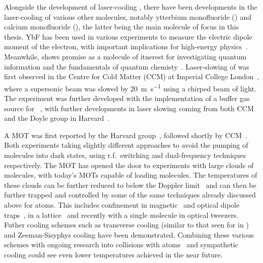 Alongside the development of laser-cooling \SrF{}, there have been developments
in the laser-cooling of various other molecules, notably ytterbium monofluoride
(\YbF{}) and calcium monofluoride (\CaF{}), the latter being the main molecule
of focus in this thesis. YbF has been used in various experiments to measure
the electric dipole moment of the electron, with important implications for
high-energy physics~\cite{}. Meanwhile, \CaF{} shows promise as a molecule of
itnerest for investigating quantum information and the fundamentals of quantum
chemisty~\cite{}. Laser-slowing of \CaF{} was first observed in the Centre for
Cold Matter (CCM) at Imperial College London~\cite{PhysRevA.89.053416}, where a
supersonic beam was slowed by \SI{20}{\meter\per\second} using a chirped beam of
light. The \CaF{} experiment was further developed with the implementation of a
buffer gas source for \CaF{}~\cite{Truppe2018}, with further developments in
laser slowing coming from both CCM~\cite{Truppe2017a} and the Doyle group in
Harvard~\cite{0953-4075-49-17-174001}.

A \CaF{} MOT was first reported by the Harvard
group~\cite{PhysRevLett.119.103201}, followed shortly by CCM~\cite{}. Both
experiments taking slightly different approaches to avoid the pumping of
molecules into dark states, using r.f.\ switching and dual-frequency techniques
respectively. The \CaF{} MOT has opened the door to experiments with large
clouds of \CaF{} molecules, with today's MOTs capable of loading 
molecules. The temperatures of these clouds can be further reduced to below the
Doppler limit~\cite{Truppe2017, PhysRevLett.123.033202} and can then be further
trapped and controlled by some of the same techniques already discussed above
for atoms. This includes confinement in magnetic~\cite{WilliamsMagnetic2018}
and optical dipole traps~\cite{}, in a
lattice~\cite{} and recently with a single \CaF{} molecule in optical
tweezers. Futher cooling schemes such as transverse
cooling (similar to that seen for \YbF in ) and
Zeeman-Sisyphys cooling have been demonstrated\cite{Fitch2016,
PhysRevLett.127.263002}. Combining these various schemes with ongoing research
into collisions with atoms~\cite{PhysRevLett.126.153401} and sympathetic
cooling could see even lower \CaF{} temperatures achieved in the near future.

